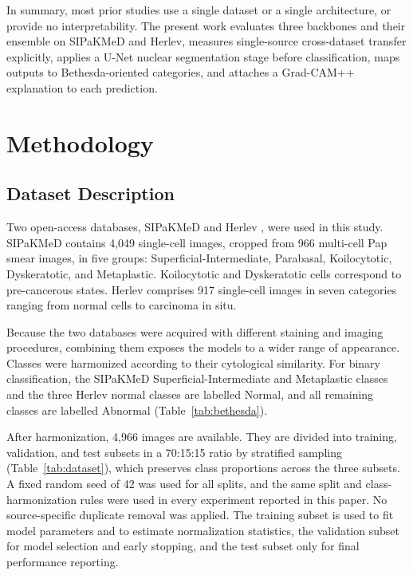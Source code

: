 \documentclass[conference]{IEEEtran}
\begin{document}
In summary, most prior studies use a single dataset or a single architecture, or provide no interpretability. The present work evaluates three backbones and their ensemble on SIPaKMeD and Herlev, measures single-source cross-dataset transfer explicitly, applies a U-Net nuclear segmentation stage before classification, maps outputs to Bethesda-oriented categories, and attaches a Grad-CAM++ explanation to each prediction.

\section{Methodology}
\label{sec:method}

\subsection{Dataset Description}
\label{sec:data}

Two open-access databases, SIPaKMeD \cite{plissiti2018sipakmed} and Herlev \cite{jantzen2005}, were used in this study. SIPaKMeD contains 4,049 single-cell images, cropped from 966 multi-cell Pap smear images, in five groups: Superficial-Intermediate, Parabasal, Koilocytotic, Dyskeratotic, and Metaplastic. Koilocytotic and Dyskeratotic cells correspond to pre-cancerous states. Herlev comprises 917 single-cell images in seven categories ranging from normal cells to carcinoma in situ.

Because the two databases were acquired with different staining and imaging procedures, combining them exposes the models to a wider range of appearance. Classes were harmonized according to their cytological similarity. For binary classification, the SIPaKMeD Superficial-Intermediate and Metaplastic classes and the three Herlev normal classes are labelled Normal, and all remaining classes are labelled Abnormal (Table~\ref{tab:bethesda}).

After harmonization, 4,966 images are available. They are divided into training, validation, and test subsets in a 70:15:15 ratio by stratified sampling (Table~\ref{tab:dataset}), which preserves class proportions across the three subsets. A fixed random seed of 42 was used for all splits, and the same split and class-harmonization rules were used in every experiment reported in this paper. No source-specific duplicate removal was applied. The training subset is used to fit model parameters and to estimate normalization statistics, the validation subset for model selection and early stopping, and the test subset only for final performance reporting.
\end{document}

